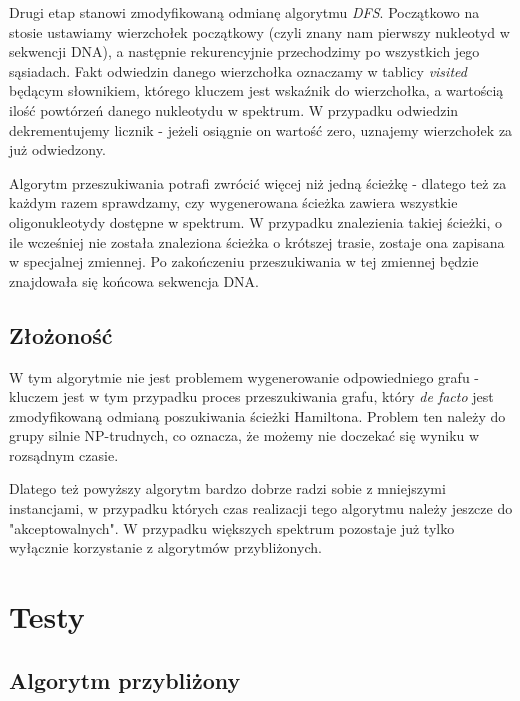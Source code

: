 \documentclass{article}
\begin{document}
Drugi etap stanowi zmodyfikowaną odmianę algorytmu \textit{DFS}. Początkowo na stosie ustawiamy wierzchołek początkowy (czyli znany nam pierwszy nukleotyd w sekwencji DNA), a następnie rekurencyjnie przechodzimy po wszystkich jego sąsiadach. Fakt odwiedzin danego wierzchołka oznaczamy w tablicy \textit{visited} będącym słownikiem, którego kluczem jest wskaźnik do wierzchołka, a wartością ilość powtórzeń danego nukleotydu w spektrum. W przypadku odwiedzin dekrementujemy licznik - jeżeli osiągnie on wartość zero, uznajemy wierzchołek za już odwiedzony. 

Algorytm przeszukiwania potrafi zwrócić więcej niż jedną ścieżkę - dlatego też za każdym razem  sprawdzamy, czy wygenerowana ścieżka zawiera wszystkie oligonukleotydy dostępne w spektrum. W przypadku znalezienia takiej ścieżki, o ile wcześniej nie została znaleziona ścieżka o krótszej trasie, zostaje ona zapisana w specjalnej zmiennej. Po zakończeniu przeszukiwania w tej zmiennej będzie znajdowała się końcowa sekwencja DNA.

\subsection{Złożoność}

W tym algorytmie nie jest problemem wygenerowanie odpowiedniego grafu - kluczem jest w tym przypadku proces przeszukiwania grafu, który \textit{de facto} jest zmodyfikowaną odmianą poszukiwania ścieżki Hamiltona. Problem ten należy do grupy silnie NP-trudnych, co oznacza, że możemy nie doczekać się wyniku w rozsądnym czasie. 

Dlatego też powyższy algorytm bardzo dobrze radzi sobie z mniejszymi instancjami, w przypadku których czas realizacji tego algorytmu należy jeszcze do "akceptowalnych". W przypadku większych spektrum pozostaje już tylko wyłącznie korzystanie z algorytmów przybliżonych.

\section{Testy}

\subsection{Algorytm przybliżony}
\end{document}

